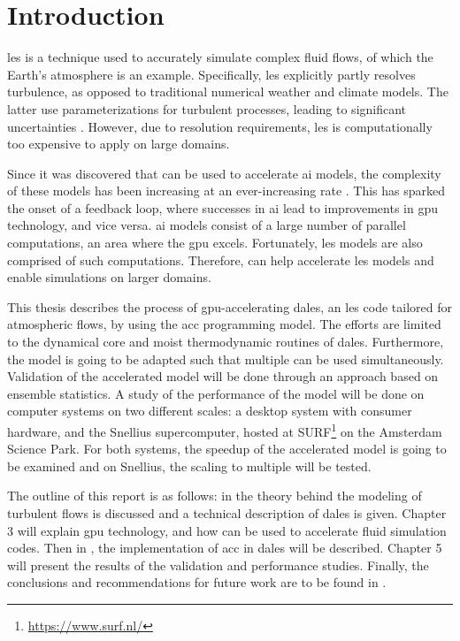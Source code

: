 \chapter{Introduction}
\acrfull{les} is a technique used to accurately simulate complex fluid flows, of which the Earth's atmosphere is an example. Specifically, \acrshort{les} explicitly partly resolves turbulence, as opposed to traditional numerical weather and climate models. The latter use parameterizations for turbulent processes, leading to significant uncertainties \citep{schalkwijkWeatherForecastingUsing2015}. However, due to resolution requirements, \acrshort{les} is computationally too expensive to apply on large domains. 

Since it was discovered that  can be used to accelerate \acrfull{ai} models, the complexity of these models has been increasing at an ever-increasing rate \citep{mittalSurveyTechniquesOptimizing2019}. This has sparked the onset of a feedback loop, where successes in \acrshort{ai} lead to improvements in \acrshort{gpu} technology, and vice versa. \acrshort{ai} models consist of a large number of parallel computations, an area where the \acrshort{gpu} excels. Fortunately, \acrshort{les} models are also comprised of such computations. Therefore,  can help accelerate \acrshort{les} models and enable simulations on larger domains.

This thesis describes the process of \acrshort{gpu}-accelerating \acrshort{dales}, an \acrshort{les} code tailored for atmospheric flows, by using the \acrshort{acc} programming model. The efforts are limited to the dynamical core and moist thermodynamic routines of \acrshort{dales}. Furthermore, the model is going to be adapted such that multiple  can be used simultaneously. Validation of the accelerated model will be done through an approach based on ensemble statistics. A study of the performance of the model will be done on computer systems on two different scales: a desktop system with consumer hardware, and the Snellius supercomputer, hosted at SURF\footnote{\url{https://www.surf.nl/}} on the Amsterdam Science Park. For both systems, the speedup of the accelerated model is going to be examined and on Snellius, the scaling to multiple  will be tested.

The outline of this report is as follows: in  the theory behind the modeling of turbulent flows is discussed and a technical description of \acrshort{dales} is given. Chapter 3 will explain \acrshort{gpu} technology, and how  can be used to accelerate fluid simulation codes. Then in , the implementation of \acrshort{acc} in \acrshort{dales} will be described. Chapter 5 will present the results of the validation and performance studies. Finally, the conclusions and recommendations for future work are to be found in .